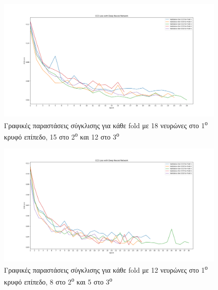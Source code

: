 \documentclass[12pt,a4paper]{article}
\begin{document}
\begin{figure}[H]
	\includegraphics[width=\textwidth]{32. hidden layers 18 - 15 - 12.png}
    \caption{Γραφικές παραστάσεις σύγκλισης για κάθε fold με 18 νευρώνες στο 1\textsuperscript{ο} κρυφό επίπεδο, 15 στο 2\textsuperscript{ο} και 12 στο 3\textsuperscript{ο}}
\end{figure}

\begin{figure}[H]
	\includegraphics[width=\textwidth]{33. hidden layers 23 - 20 - 18.png}
    \caption{Γραφικές παραστάσεις σύγκλισης για κάθε fold με 12 νευρώνες στο 1\textsuperscript{ο} κρυφό επίπεδο, 8 στο 2\textsuperscript{ο} και 5 στο 3\textsuperscript{ο}}
\end{figure}
\end{document}
